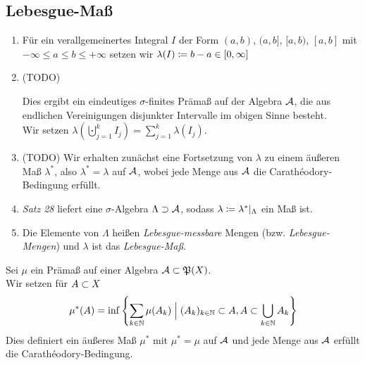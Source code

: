 \documentclass[skript.tex]{subfiles}
\begin{document}
	
	\subsection*{Lebesgue-Maß}
		\begin{enumerate}[(1)]
			\item Für ein verallgemeinertes Integral $I$ der Form
			$(a,b)$, $(a,b]$, $[a,b)$, $[a,b]$ mit \\ $-\infty \leq a \leq b \leq +\infty$ setzen wir
			$\lambda(I) \coloneqq b-a \in [0,\infty]$
			\item (TODO)
				\begin{lem}
					\unskip
					Dies ergibt ein eindeutiges $\sigma$-finites Prämaß auf der Algebra $\mathcal{A}$,
					die aus endlichen Vereinigungen disjunkter Intervalle im obigen Sinne besteht. \\
					Wir setzen
					$\lambda{\left(\bigcupdot_{j=1}^k I_j \right)} = \sum_{j=1}^k \lambda(I_j)$.
				\end{lem}
			\item (TODO) Wir erhalten zunächst eine Fortsetzung von $\lambda$ zu einem äußeren Maß
				$\lambda^*$, also $\lambda^*=\lambda$ auf $\mathcal{A}$, wobei jede Menge aus
				$\mathcal{A}$ die Carathéodory-Bedingung erfüllt.
			\item \emph{Satz 28} liefert eine $\sigma$-Algebra $\Lambda\supset\mathcal{A}$, sodass 
				$\lambda \coloneqq \lambda^*{\mid_\Lambda}$ ein Maß ist.
			\item
				\begin{defin}
					\unskip
					Die Elemente von $\Lambda$ heißen \textit{Lebesgue-messbare} Mengen (bzw.
					\textit{Lebesgue-Mengen}) und $\lambda$ ist das \textit{Lebesgue-Maß}.
				\end{defin}
		\end{enumerate}
		
		\addtocounter{cntr}{-3} %
		\begin{lem}[Ad 3]
			Sei $\mu$ ein Prämaß auf einer Algebra $\mathcal{A} \subset \mathfrak{P}(X)$. \\
			Wir setzen für $A \subset X$
			\[
				\mu^*(A) = \inf\left\{ 
				  \sum_{k\in\mathbb{N}} \mu(A_k)
				  \Bigm\vert (A_k)_{k\in\mathbb{N}} \subset A, A \subset \bigcup_{k\in\mathbb{N}} A_k
				\right\}
			\]
			Dies definiert ein äußeres Maß $\mu^*$ mit $\mu^* = \mu$ auf $\mathcal{A}$
			und jede Menge aus $\mathcal{A}$ erfüllt die Carathéodory-Bedingung. %
		\end{lem}
		\addtocounter{cntr}{2} %
		
\end{document}
